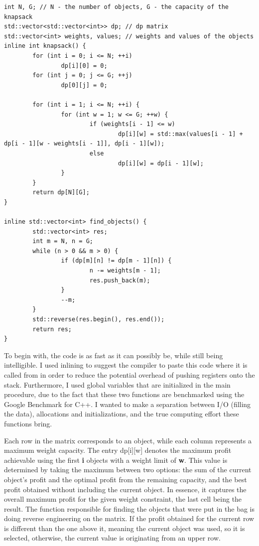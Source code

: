 \documentclass{llncs}
\begin{document}
\begin{lstlisting}
int N, G; // N - the number of objects, G - the capacity of the knapsack
std::vector<std::vector<int>> dp; // dp matrix
std::vector<int> weights, values; // weights and values of the objects
inline int knapsack() {
        for (int i = 0; i <= N; ++i)
                dp[i][0] = 0;
        for (int j = 0; j <= G; ++j)
                dp[0][j] = 0;

        for (int i = 1; i <= N; ++i) {
                for (int w = 1; w <= G; ++w) {
                        if (weights[i - 1] <= w)
                                dp[i][w] = std::max(values[i - 1] + dp[i - 1][w - weights[i - 1]], dp[i - 1][w]);
                        else
                                dp[i][w] = dp[i - 1][w];
                }
        }
        return dp[N][G];
}

inline std::vector<int> find_objects() {
        std::vector<int> res;
        int m = N, n = G;
        while (n > 0 && m > 0) {
                if (dp[m][n] != dp[m - 1][n]) {
                        n -= weights[m - 1];
                        res.push_back(m);
                }
                --m;
        }
        std::reverse(res.begin(), res.end());
        return res;
}
\end{lstlisting}

To begin with, the code is as fast as it can possibly be, while still being intelligible. I used inlining
to suggest the compiler to paste this code where it is called from in order to reduce the potential overhead
of pushing registers onto the stack. Furthermore, I used global variables that are initialized in the main
procedure, due to the fact that these two functions are benchmarked using the Google Benchmark for C++. I
wanted to make a separation between I/O (filling the data), allocations and initializations, and the true
computing effort these functions bring.

Each row in the matrix corresponds to an object, while each column represents a maximum weight capacity.
The entry dp[i][w] denotes the maximum profit achievable using the first \textbf{i} objects with a weight
limit of \textbf{w}. This value is determined by taking the maximum between two options: the sum of the
current object's profit and the optimal profit from the remaining capacity, and the best profit obtained
without including the current object. In essence, it captures the overall maximum profit for the given weight
constraint, the last cell being the result. The function responsible for finding the objects that were put
in the bag is doing reverse engineering on the matrix. If the profit obtained for the current row is different
than the one above it, meaning the current object was used, so it is selected, otherwise, the current value
is originating from an upper row.
\end{document}
